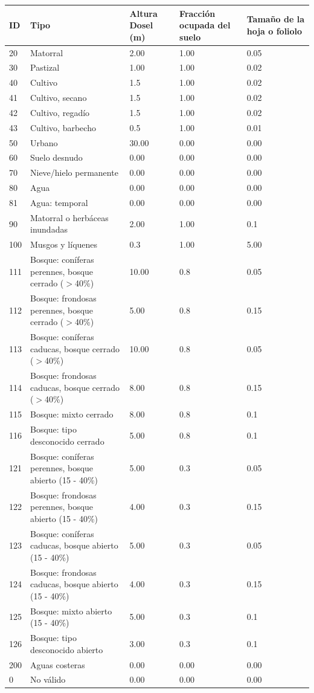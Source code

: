 \documentclass[a4paper,11pt]{article}
\begin{document}
      \begin{table}[H]
      \centering
      \footnotesize
       \begin{tabular}{lp{5cm}b{1.2cm}b{1.2cm}b{1.2cm}}
       \toprule
        ID& Tipo& Altura Dosel (m)& Fracción ocupada del suelo& Tamaño de la hoja o foliolo\\
        \midrule
        20& Matorral& 2.00& 1.00& 0.05\\
        30& Pastizal& 1.00& 1.00& 0.02\\
        40& Cultivo& 1.5& 1.00& 0.02\\
        41& Cultivo, secano& 1.5& 1.00& 0.02\\
        42& Cultivo, regadío& 1.5& 1.00& 0.02\\
        43& Cultivo, barbecho& 0.5& 1.00& 0.01\\
        50& Urbano& 30.00& 0.00& 0.00\\
        60& Suelo desnudo& 0.00& 0.00& 0.00\\
        70& Nieve/hielo permanente& 0.00& 0.00& 0.00\\
        80& Agua& 0.00& 0.00& 0.00\\
        81& Agua: temporal& 0.00& 0.00& 0.00\\
        90& Matorral o herbáceas inundadas& 2.00& 1.00& 0.1\\
        100& Musgos y líquenes& 0.3& 1.00& 5.00\\
        111& Bosque: coníferas perennes, bosque cerrado ($>$40\%)& 10.00& 0.8& 0.05\\
        112& Bosque: frondosas perennes, bosque cerrado ($>$40\%)& 5.00& 0.8& 0.15\\
        113& Bosque: coníferas caducas, bosque cerrado ($>$40\%)& 10.00& 0.8& 0.05\\
        114& Bosque: frondosas caducas, bosque cerrado ($>$40\%) & 8.00& 0.8& 0.15\\
        115& Bosque: mixto cerrado& 8.00& 0.8& 0.1\\
        116& Bosque: tipo desconocido cerrado& 5.00& 0.8& 0.1\\
        121& Bosque: coníferas perennes, bosque abierto (15 - 40\%)& 5.00& 0.3& 0.05\\
        122& Bosque: frondosas perennes, bosque abierto (15 - 40\%)& 4.00& 0.3& 0.15\\
        123& Bosque: coníferas caducas, bosque abierto (15 - 40\%)& 5.00& 0.3& 0.05\\
        124& Bosque: frondosas caducas, bosque abierto (15 - 40\%)& 4.00& 0.3& 0.15\\
        125& Bosque: mixto abierto (15 - 40\%)& 5.00& 0.3& 0.1\\
        126& Bosque: tipo desconocido abierto & 3.00& 0.3& 0.1\\
        200& Aguas costeras& 0.00& 0.00& 0.00\\
        0& No válido& 0.00& 0.00& 0.00\\
        \bottomrule
       \end{tabular}
      \end{table}
\end{document}
